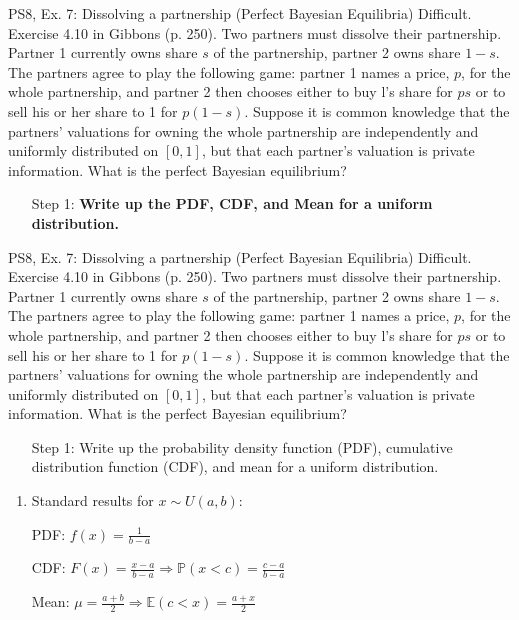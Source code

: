 \begin{frame}{PS8, Ex. 7: Dissolving a partnership (Perfect Bayesian Equilibria)}
    Difficult. Exercise 4.10 in Gibbons (p. 250). Two partners must dissolve their partnership. Partner 1 currently owns share $s$ of the partnership, partner 2 owns share $1-s$. The partners agree to play the following game: partner 1 names a price, $p$, for the whole partnership, and partner 2 then chooses either to buy l's share for $ps$ or to sell his or her share to 1 for $p(1-s)$. Suppose it is common knowledge that the partners' valuations for owning the whole partnership are independently and uniformly distributed on $[0,1]$, but that each partner's valuation is private information. What is the perfect Bayesian equilibrium?\vspace{-8pt}
    \begin{multicols}{2}
      \begin{itemize}
        \item[Step 1:] \textbf{Write up the PDF, CDF, and Mean for a uniform distribution.}
      \end{itemize}
      \vfill\null\columnbreak
      \vfill\null
    \end{multicols}
\end{frame}
\begin{frame}{PS8, Ex. 7: Dissolving a partnership (Perfect Bayesian Equilibria)}
    Difficult. Exercise 4.10 in Gibbons (p. 250). Two partners must dissolve their partnership. Partner 1 currently owns share $s$ of the partnership, partner 2 owns share $1-s$. The partners agree to play the following game: partner 1 names a price, $p$, for the whole partnership, and partner 2 then chooses either to buy l's share for $ps$ or to sell his or her share to 1 for $p(1-s)$. Suppose it is common knowledge that the partners' valuations for owning the whole partnership are independently and uniformly distributed on $[0,1]$, but that each partner's valuation is private information. What is the perfect Bayesian equilibrium?\vspace{-8pt}
    \begin{multicols}{2}
      \begin{itemize}
        \item[Step 1:] Write up the probability density function (PDF), cumulative distribution function (CDF), and mean for a uniform distribution.
      \end{itemize}
      \vfill\null\columnbreak
      \begin{enumerate}
        \item Standard results for $x\sim U(a, b):$
        \item[PDF:]  $f(x)=\frac{1}{b-a}$
        \item[CDF:]  $F(x)=\frac{x-a}{b-a}\Rightarrow\mathbb{P}(x<c)=\frac{c-a}{b-a}$
        \item[Mean:] $\mu=\frac{a+b}{2}\Rightarrow\mathbb{E}(c<x)=\frac{a+x}{2}$
      \end{enumerate}
      \vfill\null
    \end{multicols}
\end{frame}
